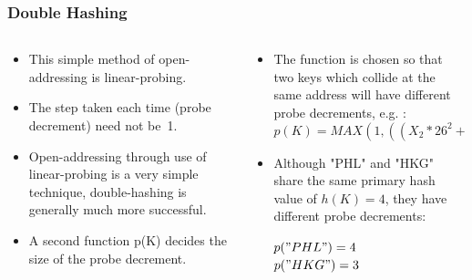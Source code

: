 
\begin{frame}[fragile]
\frametitle{Double Hashing}
\begin{columns}[T]

\begin{column}{0.35\textwidth}
\begin{itemize}[<+->]
\item This simple method of open-addressing is linear-probing.
\item The step taken each time (probe decrement) need not be~1.
\item Open-addressing through use of linear-probing is a very simple technique, double-hashing is generally much more successful.
\item A second function p(K) decides the size of the probe decrement.
\end{itemize}
\end{column}

\pause
\begin{column}{0.55\textwidth}
\begin{itemize}[<+->]
\item The function is chosen so that two keys which collide at the same address will have different probe decrements, e.g. :
{\small
\[
p(K) = MAX (1, ((X_2*26^2 + X_1*26+X_0)/11)\%11)
\]
}
\item Although "PHL" and "HKG" share the same primary hash value of $h(K)=4$, they
have different probe decrements:

$p("PHL")=4$\\

$p("HKG")=3$
\end{itemize}
\end{column}

\end{columns}
\end{frame}


